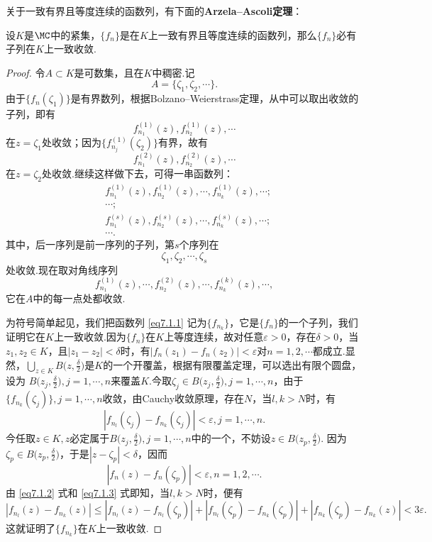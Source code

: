 关于一致有界且等度连续的函数列，有下面的\textbf{Arzela--Ascoli定理}：
\begin{theorem}\label{thm7.1.4}
设$K$是$\MC$中的紧集，$\{f_n\}$是在$K$上一致有界且等度连续的函数列，那么$\{f_n\}$必有子列在$K$上一致收敛.
\end{theorem}
\begin{proof}
令$A\subset K$是可数集，且在$K$中稠密.记
\[A=\{\zeta_1,\zeta_2,\cdots\}.\]
由于$\{f_n(\zeta_1)\}$是有界数列，根据Bolzano--Weierstrass定理，从中可以取出收敛的子列，即有
\[f_{n_1}^{(1)}(z),f_{n_2}^{(1)}(z),\cdots\]
在$z=\zeta_1$处收敛；因为$\{f_{n_j}^{(1)}(\zeta_2)\}$有界，故有
\[f_{n_1}^{(2)}(z),f_{n_2}^{(2)}(z),\cdots\]
在$z=\zeta_2$处收敛.继续这样做下去，可得一串函数列：
\begin{align*}
&f_{n_1}^{(1)}(z),f_{n_2}^{(1)}(z),\cdots,f_{n_k}^{(1)}(z),\cdots;\\
&\cdots;\\
&f_{n_1}^{(s)}(z),f_{n_2}^{(s)}(z),\cdots,f_{n_k}^{(s)}(z),\cdots;\\
&\cdots.
\end{align*}
其中，后一序列是前一序列的子列，第$s$个序列在
\[\zeta_1,\zeta_2,\cdots,\zeta_s\]
处收敛.现在取对角线序列
\begin{equation}\label{eq7.1.1}
f_{n_1}^{(1)}(z),\cdots,f_{n_2}^{(2)}(z),\cdots,f_{n_k}^{(k)}(z),\cdots,
\end{equation}
它在$A$中的每一点处都收敛.

为符号简单起见，我们把函数列 \eqref{eq7.1.1} 记为$\{f_{n_k}\}$，它是$\{f_n\}$的一个子列，我们证明它在$K$上一致收敛.因为$\{f_n\}$在$K$上等度连续，故对任意$\varepsilon>0$，存在$\delta>0$，当$z_1,z_2\in K$，且$|z_1-z_2|<\delta$时，有$|f_n(z_1)-f_n(z_2)|<\varepsilon$对$n=1,2,\cdots$都成立.显然，$\bigcup_{z\in K}B\bigg(z,\frac\delta2\bigg)$是$K$的一个开覆盖，根据有限覆盖定理，可以选出有限个圆盘，设为
$B\bigg(z_j,\frac\delta2\bigg),j=1,\cdots,n$来覆盖$K$.今取$\zeta_j\in B\bigg(z_j,\frac\delta2\bigg),j=1,\cdots,n$，由于$\{f_{n_k}(\zeta_j)\},j=1,\cdots,n$收敛，由Cauchy收敛原理，存在$N$，当$l,k>N$时，有
\begin{equation}\label{eq7.1.2}
|f_{n_l}(\zeta_j)-f_{n_k}(\zeta_j)|<\varepsilon,j=1,\cdots,n.
\end{equation}
今任取$z\in K,z$必定属于$B\bigg(z_j,\frac\delta2\bigg),j=1,\cdots,n$中的一个，不妨设$z\in B\bigg(z_p,\frac\delta2\bigg)$. 因为$\zeta_p\in B\bigg(z_p,\frac\delta2\bigg)$，于是$|z-\zeta_p|<\delta$，因而
\begin{equation}\label{eq7.1.3}
|f_n(z)-f_n(\zeta_p)|<\varepsilon,n=1,2,\cdots.
\end{equation}
由 \eqref{eq7.1.2} 式和 \eqref{eq7.1.3} 式即知，当$l,k>N$时，便有
\begin{equation*}
|f_{n_l}(z)-f_{n_k}(z)|\le|f_{n_l}(z)-f_{n_l}(\zeta_p)|+
|f_{n_l}(\zeta_p)-f_{n_k}(\zeta_p)|+|f_{n_k}(\zeta_p)-f_{n_k}(z)|
<3\varepsilon.
\end{equation*}
这就证明了$\{f_{n_k}\}$在$K$上一致收敛.
\end{proof}

